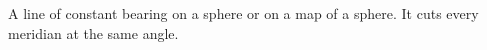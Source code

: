 A line of constant bearing on a sphere or on a map of a sphere. It cuts
every meridian at the same angle.